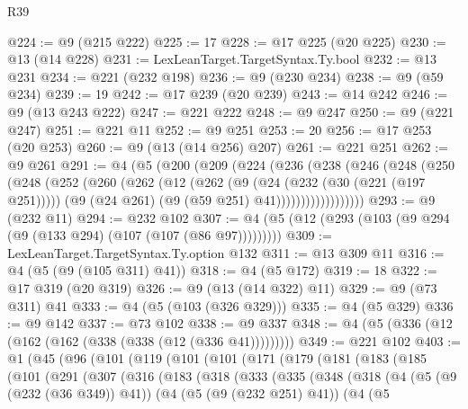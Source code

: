 \begin{lexlean}{R39}
\begin{coremodule}
@224 := @9 (@215 @222)
@225 := 17
@228 := @17 @225 (@20 @225)
@230 := @13 (@14 @228)
@231 := LexLeanTarget.TargetSyntax.Ty.bool
@232 := @13 @231
@234 := @221 (@232 @198)
@236 := @9 (@230 @234)
@238 := @9 (@59 @234)
@239 := 19
@242 := @17 @239 (@20 @239)
@243 := @14 @242
@246 := @9 (@13 @243 @222)
@247 := @221 @222
@248 := @9 @247
@250 := @9 (@221 @247)
@251 := @221 @11
@252 := @9 @251
@253 := 20
@256 := @17 @253 (@20 @253)
@260 := @9 (@13 (@14 @256) @207)
@261 := @221 @251
@262 := @9 @261
@291 := @4
    (@5
      (@200
        (@209
          (@224
            (@236
              (@238
                (@246
                  (@248
                    (@250
                      (@248
                        (@252
                          (@260
                            (@262
                              (@12
                                (@262
                                  (@9
                                    (@24 (@232 (@30 (@221 (@197 @251)))))
                                    (@9 (@24 @261) (@9 (@59 @251) @41))))))))))))))))))
@293 := @9 (@232 @11)
@294 := @232 @102
@307 := @4 (@5 (@12 (@293 (@103 (@9 @294 (@9 (@133 @294) (@107 (@107 (@86 @97)))))))))
@309 := LexLeanTarget.TargetSyntax.Ty.option @132
@311 := @13 @309 @11
@316 := @4 (@5 (@9 (@105 @311) @41))
@318 := @4 (@5 @172)
@319 := 18
@322 := @17 @319 (@20 @319)
@326 := @9 (@13 (@14 @322) @11)
@329 := @9 (@73 @311) @41
@333 := @4 (@5 (@103 (@326 @329)))
@335 := @4 (@5 @329)
@336 := @9 @142
@337 := @73 @102
@338 := @9 @337
@348 := @4 (@5 (@336 (@12 (@162 (@162 (@338 (@338 (@12 (@336 @41)))))))))
@349 := @221 @102
@403 := @1
    (@45
      (@96
        (@101
          (@119
            (@101
              (@101
                (@171
                  (@179
                    (@181
                      (@183
                        (@185
                          (@101
                            (@291
                              (@307
                                (@316
                                  (@183
                                    (@318
                                      (@333
                                        (@335
                                          (@348
                                            (@318
                                              (@4
                                                (@5 (@9 (@232 (@36 @349)) @41))
                                                (@4
                                                  (@5 (@9 (@232 @251) @41))
                                                  (@4
                                                    (@5

\end{coremodule}
\end{lexlean}
